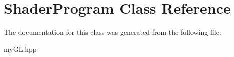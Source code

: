 \hypertarget{classShaderProgram}{}\section{Shader\+Program Class Reference}
\label{classShaderProgram}


The documentation for this class was generated from the following file\+:\begin{DoxyCompactItemize}
\item 
my\+G\+L.\+hpp\end{DoxyCompactItemize}
